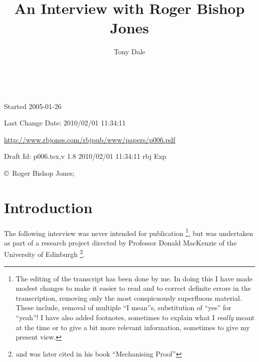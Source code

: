 \documentclass[10pt,titlepage]{book}
\title{An Interview with Roger Bishop Jones}
\author{Tony Dale}
\date{\ }
\begin{document}
\frontmatter

\begin{titlepage}
\maketitle

\vfill



\vfill

\begin{centering}

\vfill

\footnotesize{
Started 2005-01-26

Last Change $ $Date: 2010/02/01 11:34:11 $ $

\href{http://www.rbjones.com/rbjpub/www/papers/p006.pdf}{http://www.rbjones.com/rbjpub/www/papers/p006.pdf}

Draft $ $Id: p006.tex,v 1.8 2010/02/01 11:34:11 rbj Exp $ $

\copyright\ Roger Bishop Jones;

}%
\end{centering}

\end{titlepage}

{\parskip=0pt\tableofcontents}

\mainmatter

\chapter{Introduction}
The following interview was never intended for publication%
\footnote{
The editing of the transcript has been done by me.
In doing this I have made modest changes to make it easier to read and to correct definite errors in the transcription, removing only the most conspicuously superfluous material.
These include, removal of multiple ``I mean''s, substitution of ``yes'' for ``yeah''!
I have also added footnotes, sometimes to explain what I {\it really} meant at the time or to give a bit more relevant information, sometimes to give my present view.

}, but was undertaken as part of a research project directed by Professor Donald MacKenzie of the University of Edinburgh%
\footnote{
and was later cited in his book ``Mechanising Proof''\cite{mackenzie}}.
\end{document}
